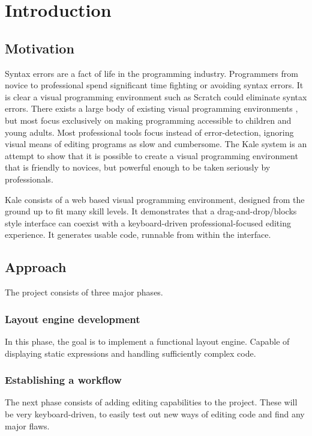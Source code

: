 \chapter{Introduction}

\section{Motivation}
Syntax errors are a fact of life in the programming industry. Programmers from
novice \citep{Denny2011} to professional spend significant time fighting or
avoiding syntax errors. It is clear a visual programming environment such
as Scratch could eliminate syntax errors. There exists a large body of existing
visual programming environments \citep{Beldie1983}, but most focus exclusively
on making programming accessible to children and young adults. Most
professional tools focus instead of error-detection, ignoring visual means of
editing programs as slow and cumbersome. The Kale system is an attempt to show that it is possible to create a
visual programming environment that is friendly to novices, but powerful enough to be
taken seriously by professionals. 

Kale consists of a web based visual programming environment, designed
from the ground up to fit many skill levels. It demonstrates that a
drag-and-drop/blocks style interface can coexist with a keyboard-driven
professional-focused editing experience. It generates usable code,
runnable from within the interface.

\section{Approach}

The project consists of three major phases.

\subsection{Layout engine development}
In this phase, the goal is to implement a functional layout engine. Capable
of displaying static expressions and handling sufficiently complex code.

\subsection{Establishing a workflow}
The next phase consists of adding editing capabilities to the project.
These will be very keyboard-driven, to easily test out new ways of editing
code and find any major flaws.

